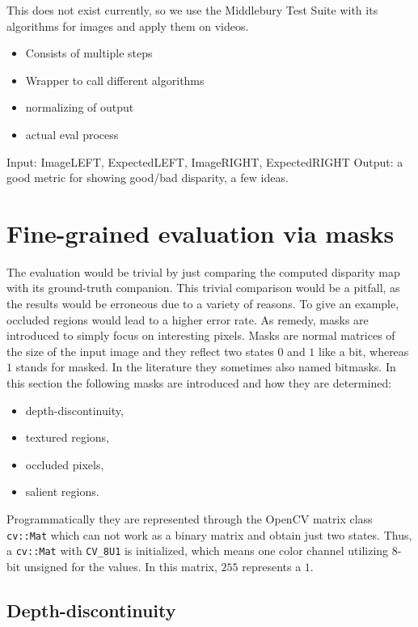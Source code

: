 This does not exist currently, so we use the Middlebury Test Suite with its algorithms for images and apply them on videos.

\begin{itemize}
	\item Consists of multiple steps
	\item Wrapper to call different algorithms
	\item normalizing of output
	\item actual eval process
\end{itemize}

Input: ImageLEFT, ExpectedLEFT, ImageRIGHT, ExpectedRIGHT
Output: a good metric for showing good/bad disparity, a few ideas.

\section{Fine-grained evaluation via masks}

The evaluation would be trivial by just comparing the computed disparity map with its ground-truth companion.
This trivial comparison would be a pitfall, as the results would be erroneous due to a variety of reasons.
To give an example, occluded regions would lead to a higher error rate.
As remedy, masks are introduced to simply focus on interesting pixels.
Masks are normal matrices of the size of the input image and they reflect two states $0$ and $1$ like a bit, whereas $1$ stands for masked.
In the literature they sometimes also named bitmasks.
In this section the following masks are introduced and how they are determined:

\begin{itemize}
  \item depth-discontinuity,
  \item textured regions,
  \item occluded pixels,
  \item salient regions.
\end{itemize}

\noindent Programmatically they are represented through the OpenCV matrix class \texttt{cv::Mat} which can not work as a binary matrix and obtain just two states.
Thus, a \texttt{cv::Mat} with \texttt{CV\_8U1} is initialized, which means one color channel utilizing 8-bit unsigned for the values.
In this matrix, $255$ represents a $1$.

\subsection*{Depth-discontinuity}

